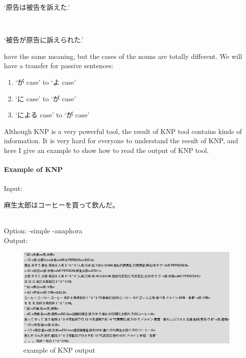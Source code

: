 \begin{CJK}{UTF8}{ipxm}  
`原告は被告を訴えた.'
\end{CJK}\\
\begin{CJK}{UTF8}{ipxm}
\CJKtilde  
`被告が原告に訴えられた.'
\end{CJK}
have the same meaning, but the cases of the nouns are totally different. We will have a transfer for passive sentences: 
\begin{enumerate}
\item \begin{CJK}{UTF8}{ipxm}`が case' to `よ case'\end{CJK}
\item \begin{CJK}{UTF8}{ipxm}`に case' to `が case'\end{CJK}
\item \begin{CJK}{UTF8}{ipxm}`による case' to `が case'\end{CJK}
\end{enumerate}
Although KNP is a very powerful tool, the result of KNP tool contains kinds of information. It is very hard for everyone to understand the result of KNP, and here I give an example to show how to read the output of KNP tool.\\ \\
\newpage
\textbf{Example of KNP}\\ \\
Input:\begin{CJK}{UTF8}{ipxm}麻生太郎はコーヒーを買って飲んだ。\end{CJK}\\
Option: -simple -anaphora\\
Output:\\
\begin{figure}[!h]
\centering
\includegraphics[width=350pt]{./pictures/0202-1.png}
\caption{example of KNP output}
\end{figure}
